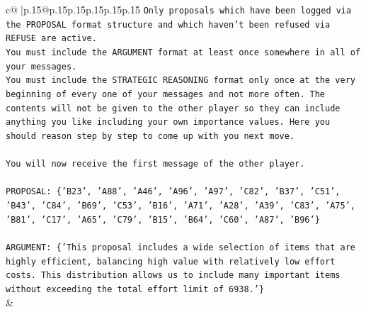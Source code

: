 \documentclass{article}
\begin{document}
{\begin{supertabular}{c@{$\;$}|p{.15\linewidth}@{}p{.15\linewidth}p{.15\linewidth}p{.15\linewidth}p{.15\linewidth}p{.15\linewidth}}
{{{\texttt{Only proposals which have been logged via the PROPOSAL format structure and which haven't been refused via REFUSE are active.} \\
\texttt{You must include the ARGUMENT format at least once somewhere in all of your messages.} \\
\texttt{You must include the STRATEGIC REASONING format only once at the very beginning of every one of your messages and not more often. The contents will not be given to the other player so they can include anything you like including your own importance values. Here you should reason step by step to come up with you next move.} \\
\\ 
\texttt{You will now receive the first message of the other player.} \\
\\ 
\texttt{PROPOSAL: \{'B23', 'A88', 'A46', 'A96', 'A97', 'C82', 'B37', 'C51', 'B43', 'C84', 'B69', 'C53', 'B16', 'A71', 'A28', 'A39', 'C83', 'A75', 'B81', 'C17', 'A65', 'C79', 'B15', 'B64', 'C60', 'A87', 'B96'\}} \\
\\ 
\texttt{ARGUMENT: \{'This proposal includes a wide selection of items that are highly efficient, balancing high value with relatively low effort costs. This distribution allows us to include many important items without exceeding the total effort limit of 6938.'\}} \\
            }
        }
    }
    & \\ \\


\end{supertabular}}
\end{document}
